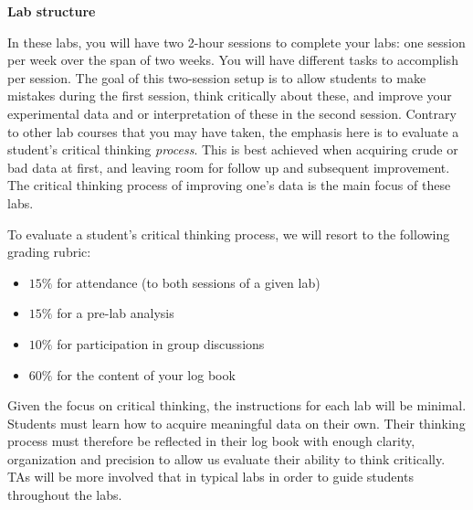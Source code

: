 \documentclass[12pt]{report}
\begin{document}
\noindent \large \textbf{Lab structure} \normalsize

In these labs, you will have two 2-hour sessions to complete your labs: one session per week over the span of two weeks. You will have different tasks to accomplish per session. The goal of this two-session setup is to allow students to make mistakes during the first session, think critically about these, and improve your experimental data and or interpretation of these in the second session. Contrary to other lab courses that you may have taken, the emphasis here is to evaluate a student's critical thinking \textit{process}. This is best achieved when acquiring crude or bad data at first, and leaving room for follow up and subsequent improvement. The critical thinking process of improving one's data is the main focus of these labs.

To evaluate a student's critical thinking process, we will resort to the following grading rubric:
\begin{itemize}
\item $15 \%$ for attendance (to both sessions of a given lab)
\item $15 \%$ for a pre-lab analysis
\item $10 \%$ for participation in group discussions
\item $60 \%$ for the content of your log book
\end{itemize}

Given the focus on critical thinking, the instructions for each lab will be minimal. Students must learn how to acquire meaningful data on their own. Their thinking process must therefore be reflected in their log book with enough clarity, organization and precision to allow us evaluate their ability to think critically. TAs will be more involved that in typical labs in order to guide students throughout the labs.
\end{document}

